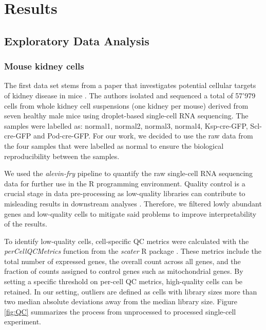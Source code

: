 

\chapter{Results}

\section{Exploratory Data Analysis}

\subsection{Mouse kidney cells} \label{mouse_dataset}
The first data set stems from a paper that investigates potential cellular targets of kidney disease in mice \citep{mouse_cells}. The authors isolated and sequenced a total of 57'979 cells from whole kidney cell suspensions (one kidney per mouse) derived from seven healthy male mice using droplet-based single-cell RNA sequencing. The samples were labelled as: normal1, normal2, normal3, normal4, Ksp-cre-GFP, Scl-cre-GFP and Pod-cre-GFP. For our work, we decided to use the raw data from the four samples that were labelled as normal to ensure the biological reproducibility between the samples.

We used the \emph{alevin-fry} pipeline to quantify the raw single-cell RNA sequencing data for further use in the R programming environment. Quality control is a crucial stage in data pre-processing as low-quality libraries can contribute to misleading results in downstream analyses \citep{OSCA}. Therefore, we filtered lowly abundant genes and low-quality cells to mitigate said problems to improve interpretability of the results. 

To identify low-quality cells, cell-specific QC metrics were calculated with the \emph{perCellQCMetrics} function from the \emph{scater} R package \citep{scater}. These metrics include the total number of expressed genes, the overall count across all genes, and the fraction of counts assigned to control genes such as mitochondrial genes. By setting a specific threshold on per-cell QC metrics, high-quality cells can be retained. In our setting, outliers are defined as cells with library sizes more than two median absolute deviations away from the median library size. Figure \ref{fig:QC} summarizes the process from unprocessed to processed single-cell experiment. 

